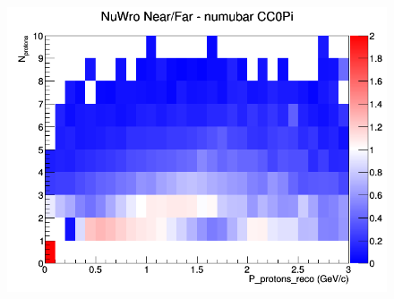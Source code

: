 \begin{figure}[h]
\endminipage
{}
\includegraphics[width=\linewidth]{eff_N_P/FGT/protons/ratios/CC0Pi_NuWro_numubar_NF_N_P.png}
\endminipage
\newline
\end{figure}
\clearpage
